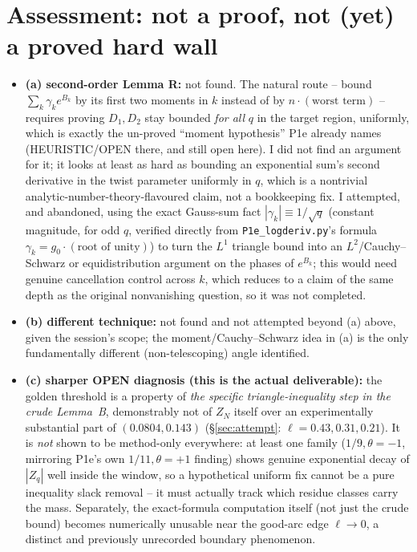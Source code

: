 \documentclass[11pt]{article}
\theoremstyle{remark}\newtheorem{remark}[theorem]{Remark}
\begin{document}
\section{Assessment: not a proof, not (yet) a proved hard wall}
\begin{itemize}
\item \textbf{(a) second-order Lemma R:} not found. The natural route -- bound $\sum_k\gamma_ke^{B_k}$ by its first two moments in $k$ instead of by $n\cdot(\text{worst term})$ -- requires proving $D_1,D_2$ stay bounded \emph{for all} $q$ in the target region, uniformly, which is exactly the un-proved ``moment hypothesis'' P1e already names (HEURISTIC/OPEN there, and still open here). I did not find an argument for it; it looks at least as hard as bounding an exponential sum's second derivative in the twist parameter uniformly in $q$, which is a nontrivial analytic-number-theory-flavoured claim, not a bookkeeping fix. I attempted, and abandoned, using the exact Gauss-sum fact $|\gamma_k|\equiv1/\sqrt q$ (constant magnitude, for odd $q$, verified directly from \texttt{P1e\_logderiv.py}'s formula $\gamma_k=g_0\cdot(\text{root of unity})$) to turn the $L^1$ triangle bound into an $L^2$/Cauchy--Schwarz or equidistribution argument on the phases of $e^{B_k}$; this would need genuine cancellation control across $k$, which reduces to a claim of the same depth as the original nonvanishing question, so it was not completed.
\item \textbf{(b) different technique:} not found and not attempted beyond (a) above, given the session's scope; the moment/Cauchy--Schwarz idea in (a) is the only fundamentally different (non-telescoping) angle identified.
\item \textbf{(c) sharper OPEN diagnosis (this is the actual deliverable):} the golden threshold is a property of \emph{the specific triangle-inequality step in the crude Lemma~B}, demonstrably not of $Z_N$ itself over an experimentally substantial part of $(0.0804,0.143)$ (\S\ref{sec:attempt}: $\ell=0.43,0.31,0.21$). It is \emph{not} shown to be method-only everywhere: at least one family ($1/9,\theta{=}-1$, mirroring P1e's own $1/11,\theta{=}+1$ finding) shows genuine exponential decay of $|Z_q|$ well inside the window, so a hypothetical uniform fix cannot be a pure inequality slack removal -- it must actually track which residue classes carry the mass. Separately, the exact-formula computation itself (not just the crude bound) becomes numerically unusable near the good-arc edge $\ell\to0$, a distinct and previously unrecorded boundary phenomenon.
\end{itemize}
\end{document}
